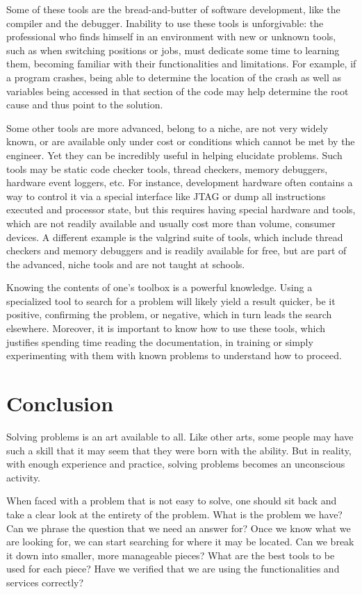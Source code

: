 Some of these tools are the bread-and-butter of software development, like the
compiler and the debugger. Inability to use these tools is unforgivable: the
professional who finds himself in an environment with new or unknown tools, such
as when switching positions or jobs, must dedicate some time to learning them,
becoming familiar with their functionalities and limitations. For example, if a
program crashes, being able to determine the location of the crash as well as
variables being accessed in that section of the code may help determine the root
cause and thus point to the solution.

Some other tools are more advanced, belong to a niche, are not very widely
known, or are available only under cost or conditions which cannot be met by the
engineer. Yet they can be incredibly useful in helping elucidate problems. Such
tools may be static code checker tools, thread checkers, memory debuggers,
hardware event loggers, etc. For instance, development hardware often contains a
way to control it via a special interface like JTAG or dump all instructions
executed and processor state, but this requires having special hardware and
tools, which are not readily available and usually cost more than volume,
consumer devices. A different example is the valgrind suite of tools, which
include thread checkers and memory debuggers and is readily available for free,
but are part of the advanced, niche tools and are not taught at schools.

Knowing the contents of one’s toolbox is a powerful knowledge. Using a
specialized tool to search for a problem will likely yield a result quicker, be
it positive, confirming the problem, or negative, which in turn leads the search
elsewhere. Moreover, it is important to know how to use these tools, which
justifies spending time reading the documentation, in training or simply
experimenting with them with known problems to understand how to proceed.

\section*{Conclusion}

Solving problems is an art available to all. Like other arts, some people may
have such a skill that it may seem that they were born with the ability. But in
reality, with enough experience and practice, solving problems becomes an
unconscious activity.

When faced with a problem that is not easy to solve, one should sit back and
take a clear look at the entirety of the problem. What is the problem we have?
Can we phrase the question that we need an answer for? Once we know what we are
looking for, we can start searching for where it may be located. Can we break it
down into smaller, more manageable pieces? What are the best tools to be used
for each piece? Have we verified that we are using the functionalities and
services correctly?

